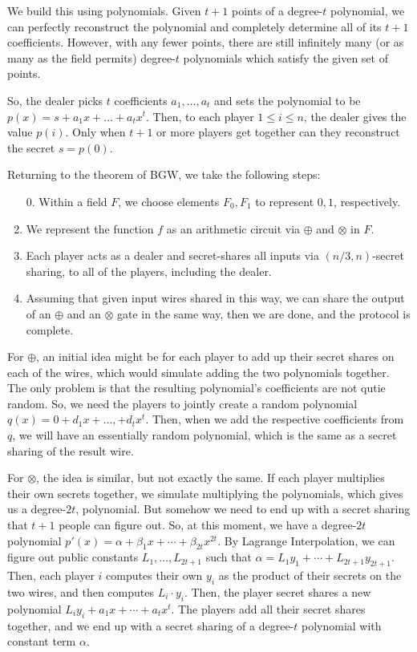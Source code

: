 \documentclass[11pt]{article}
\begin{document}
We build this using polynomials. Given \(t+1\) points of a degree-\(t\) polynomial, we can perfectly reconstruct the polynomial and completely determine all of its \(t+1\) coefficients. However, with any fewer points, there are still infinitely many (or as many as the field permits) degree-\(t\) polynomials which satisfy the given set of points.

So, the dealer picks \(t\) coefficients \(a_1,\ldots,a_t\) and sets the polynomial to be \(p(x) = s+a_1x+\ldots+a_tx^t\). Then, to each player \(1\le i\le n\), the dealer gives the value \(p(i)\). Only when \(t+1\) or more players get together can they reconstruct the secret \(s=p(0)\).\bigskip

Returning to the theorem of BGW, we take the following steps:
\begin{enumerate}
\item [0.] Within a field \(F\), we choose elements \(F_0,F_1\) to represent \(0,1\), respectively.
\item We represent the function \(f\) as an arithmetic circuit via \(\oplus\) and \(\otimes\) in \(F\).
\item Each player acts as a dealer and secret-shares all inputs via \((n/3,n)\)-secret sharing, to all of the players, including the dealer.
\item Assuming that given input wires shared in this way, we can share the output of an \(\oplus\) and an \(\otimes\) gate in the same way, then we are done, and the protocol is complete.
\end{enumerate}

For \(\oplus\), an initial idea might be for each player to add up their secret shares on each of the wires, which would simulate adding the two polynomials together.
The only problem is that the resulting polynomial's coefficients are not qutie random. 
So, we need the players to jointly create a random polynomial \(q(x)=0+d_1x+\ldots,+d_tx^t\).
Then, when we add the respective coefficients from \(q\), we will have an essentially random polynomial, which is the same as a secret sharing of the result wire.\medskip

For \(\otimes\), the idea is similar, but not exactly the same. 
If each player multiplies their own secrets together, we simulate multiplying the polynomials, which gives us a degree-\(2t\), polynomial. 
But somehow we need to end up with a secret sharing that \(t+1\) people can figure out.
So, at this moment, we have a degree-\(2t\) polynomial \(p'(x) = \alpha+\beta_1x+\cdots+\beta_{2t}x^{2t}\).
By Lagrange Interpolation, we can figure out public constants \(L_1,\ldots,L_{2t+1}\) such that \(\alpha = L_1y_1+\cdots+L_{2t+1}y_{2t+1}\).
Then, each player \(i\) computes their own \(y_i\) as the product of their secrets on the two wires, and then computes \(L_i\cdot y_i\).
Then, the player secret shares a new polynomial \(L_iy_i+a_1x+\cdots+a_tx^t\).
The players add all their secret shares together, and we end up with a secret sharing of a degree-\(t\) polynomial with constant term \(\alpha\).
\end{document}
